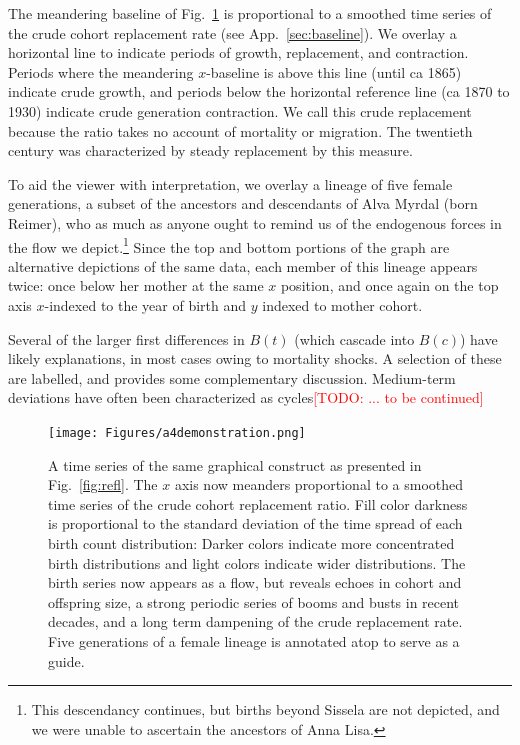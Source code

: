 \documentclass{article}
\newcommand\todo[1]{\textcolor{red}{[TODO: #1]}}
\begin{document}
The meandering baseline of Fig.~\ref{fig:foldout} is proportional to a smoothed time series of the crude cohort replacement rate (see App.~\ref{sec:baseline}). We overlay a horizontal line to indicate periods of growth, replacement, and contraction. Periods where the meandering $x$-baseline is above this line (until ca 1865) indicate crude growth, and periods below the horizontal reference line (ca 1870 to 1930) indicate crude generation contraction. We call this crude replacement because the ratio takes no account of mortality or migration. The twentieth century was characterized by steady replacement by this measure.

To aid the viewer with interpretation, we overlay a lineage of five female generations, a subset of the ancestors and descendants of Alva Myrdal (born Reimer), who as much as anyone ought to remind us of the endogenous forces in the flow we depict.\footnote{This descendancy continues, but births beyond Sissela are not depicted, and we were unable to ascertain the ancestors of Anna Lisa.} Since the top and bottom portions of the graph are alternative depictions of the same data, each member of this lineage appears twice: once below her mother at the same $x$ position, and once again on the top axis $x$-indexed to the year of birth and $y$ indexed to mother cohort.

Several of the larger first differences in $B(t)$ (which cascade into $B(c)$) have likely explanations, in most cases owing to mortality shocks. A selection of these are labelled, and \cite{utterstrom1954some} provides some complementary discussion. Medium-term deviations have often been characterized as cycles\todo{... to be continued}

\begin{figure}
\texttt{[image: Figures/a4demonstration.png]}
%
\caption{A time series of the same graphical construct as presented in Fig.~\ref{fig:refl}. The $x$ axis now meanders proportional to a smoothed time series of the crude cohort replacement ratio. Fill color darkness is proportional to the standard deviation of the time spread of each birth count distribution: Darker colors indicate more concentrated birth distributions and light colors indicate wider distributions. The birth series now appears as a flow, but reveals echoes in cohort and offspring size, a strong periodic series of booms and busts in recent decades, and a long term dampening of the crude replacement rate. Five generations of a female lineage is annotated atop to serve as a guide.}
\label{fig:foldout}
\end{figure}
\end{document}
